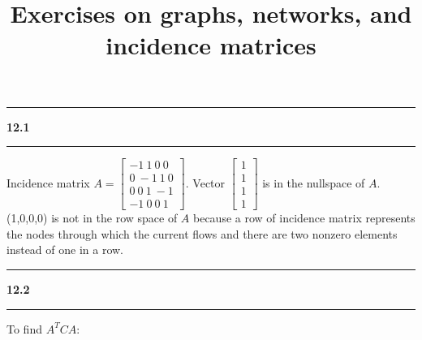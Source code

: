 \documentclass[11pt]{article}
\newcommand\question[2]{\vspace{.25in}\hrule\textbf{#1 #2}\vspace{.5em}\hrule\vspace{.10in}}
\begin{document}
\raggedright
\newcommand\NAME{Haiying Cui}  %
\newcommand\ANDREWID{Christy}     %
\newcommand\HWNUM{12}              %

\title{Exercises on graphs, networks, and incidence matrices}
\maketitle

\question{12.1}{}
Incidence matrix \(A = \begin{bmatrix} -1 \ 1 \ 0 \ 0 \\ 0 \ -1 \ 1 \ 0 \\ 0 \ 0 \ 1 \ -1 \\ -1 \ 0 \ 0 \ 1 \end{bmatrix}\). Vector \(\begin{bmatrix} 1 \\ 1 \\ 1 \\ 1 \end{bmatrix}\) is in the nullspace of \(A\). (1,0,0,0) is not in the row space of \(A\) because a row of incidence matrix represents the nodes through which the current flows and there are two nonzero elements instead of one in a row.
\question{12.2}{}
To find \(A^TCA\):
\end{document}

